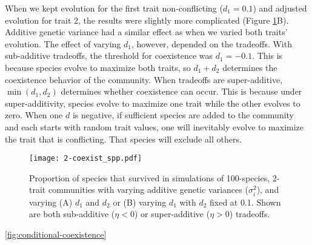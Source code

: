 When we kept evolution for the first trait non-conflicting ($d_1 = 0.1$) and
adjusted evolution for trait 2, the results were slightly more complicated
(Figure \ref{fig:coexistence-spp}B).
Additive genetic variance had a similar effect as when we varied both traits' evolution.
The effect of varying $d_1$, however, depended on the tradeoffs.
With sub-additive tradeoffs, the threshold for coexistence was $d_1 = -0.1$.
This is because species evolve to maximize both traits, so $d_1 + d_2$
determines the coexistence behavior of the community.
When tradeoffs are super-additive, $\min (d_1, d_2)$ determines whether 
coexistence can occur.
This is because under super-additivity, species evolve to maximize one trait while 
the other evolves to zero.
When one $d$ is negative, if sufficient species are added to the community and 
each starts with random trait values, 
one will inevitably evolve to maximize the trait that is conflicting. 
That species will exclude all others.


\begin{figure}[ht!]
\centering
\texttt{[image: 2-coexist\_spp.pdf]}
\caption{Proportion of species that survived in simulations of 100-species, 2-trait
    communities with varying additive genetic variances ($\sigma_i^2$), and 
    varying (A) $d_1$ and $d_2$ or (B) varying $d_1$ with $d_2$ fixed at 0.1.
    Shown are both sub-additive ($\eta < 0$) or super-additive ($\eta > 0$) tradeoffs.}
\label{fig:coexistence-spp}
\end{figure}




% 
% 



\ref{fig:conditional-coexistence}


